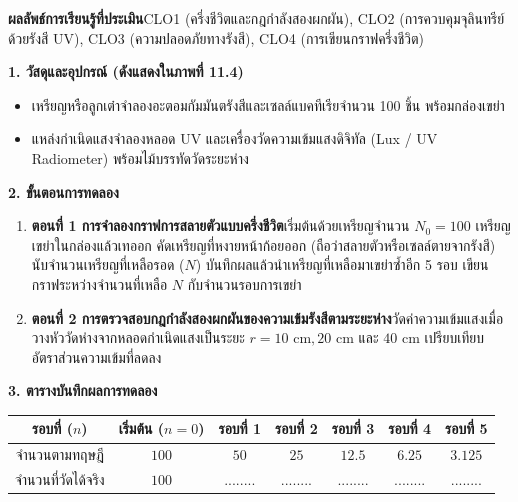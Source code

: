\begin{labbox}
\noindent\textbf{ผลลัพธ์การเรียนรู้ที่ประเมิน}\quad CLO1 (ครึ่งชีวิตและกฎกำลังสองผกผัน), CLO2 (การควบคุมจุลินทรีย์ด้วยรังสี UV), CLO3 (ความปลอดภัยทางรังสี), CLO4 (การเขียนกราฟครึ่งชีวิต)

\vspace{4pt}
\noindent\textbf{1. วัสดุและอุปกรณ์ (ดังแสดงใน\mbox{ภาพที่} 11.4)}
\begin{itemize}
    \item เหรียญหรือลูกเต๋าจำลองอะตอมกัมมันตรังสีและเซลล์แบคทีเรียจำนวน 100 ชิ้น พร้อมกล่องเขย่า
    \item แหล่งกำเนิดแสงจำลองหลอด UV และเครื่องวัดความเข้มแสงดิจิทัล (Lux / UV Radiometer) พร้อมไม้บรรทัดวัดระยะห่าง
\end{itemize}

\noindent\textbf{2. ขั้นตอนการทดลอง}
\begin{enumerate}
    \item \textbf{ตอนที่ 1 การจำลองกราฟการสลายตัวแบบครึ่งชีวิต}\quad เริ่มต้นด้วยเหรียญจำนวน $N_0 = 100$ เหรียญ เขย่าในกล่องแล้วเทออก คัดเหรียญที่หงายหน้าก้อยออก (ถือว่าสลายตัวหรือเซลล์ตายจากรังสี) นับจำนวนเหรียญที่เหลือรอด ($N$) บันทึกผลแล้วนำเหรียญที่เหลือมาเขย่าซ้ำอีก 5 รอบ เขียนกราฟระหว่างจำนวนที่เหลือ $N$ กับจำนวนรอบการเขย่า
    \item \textbf{ตอนที่ 2 การตรวจสอบกฎกำลังสองผกผันของความเข้มรังสีตามระยะห่าง}\quad วัดค่าความเข้มแสงเมื่อวางหัววัดห่างจากหลอดกำเนิดแสงเป็นระยะ $r = 10\text{ cm}, 20\text{ cm}$ และ $40\text{ cm}$ เปรียบเทียบอัตราส่วนความเข้มที่ลดลง
\end{enumerate}

\noindent\textbf{3. ตารางบันทึกผลการทดลอง}
\begin{center}
\footnotesize\setlength{\tabcolsep}{3.5pt}
\begin{tabularx}{\linewidth}{c c c c c c c}
\toprule
\textbf{รอบที่ ($n$)} & \textbf{เริ่มต้น ($n=0$)} & \textbf{รอบที่ 1} & \textbf{รอบที่ 2} & \textbf{รอบที่ 3} & \textbf{รอบที่ 4} & \textbf{รอบที่ 5} \\
\midrule
จำนวนตามทฤษฎี & $100$ & $50$ & $25$ & $12.5$ & $6.25$ & $3.125$ \\
จำนวนที่วัดได้จริง & $100$ & ........ & ........ & ........ & ........ & ........ \\
\bottomrule
\end{tabularx}
\end{center}
\end{labbox}


